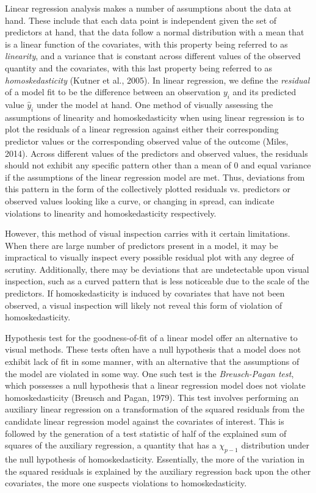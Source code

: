 		Linear regression analysis makes a number of assumptions about the data at hand. These include that each data point is independent given the set of predictors at hand, that the
		data follow a normal distribution with a mean that is a linear function of the covariates, with this property being referred to as \textit{linearity}, and a variance that is constant
		across different values of the observed quantity and the covariates, with this last property being referred to as \textit{homoskedasticity} (Kutner et al., 2005). In linear regression,
		we define the \textit{residual} of a model fit to be the difference between an observation $y_i$ and its predicted value $\hat{y}_i$ under the model at hand. One method of visually
		assessing the assumptions of linearity and homoskedasticity when using linear regression is to plot the residuals of a linear regression against either their corresponding predictor
		values or the corresponding observed value of the outcome (Miles, 2014). Across different values of the predictors and observed values, the residuals should not exhibit any specific pattern
		other than a mean of 0 and equal variance if the assumptions of the linear regression model are met. Thus, deviations from this pattern in the form of the collectively plotted residuals
		vs. predictors or observed values looking like a curve, or changing in spread, can indicate violations to linearity and homoskedasticity respectively.

		However, this method of visual inspection carries with it certain limitations. When there are large number of predictors present in a model, it may be impractical to visually inspect every
		possible residual plot with any degree of scrutiny. Additionally, there may be deviations that are undetectable upon visual inspection, such as a curved pattern that is less noticeable
		due to the scale of the predictors. If homoskedasticity is induced by covariates that have not been observed, a visual inspection will likely not reveal this form of
		violation of homoskedasticity.

		Hypothesis test for the goodness-of-fit of a linear model offer an alternative to visual methods. These tests often have a null hypothesis that a model does not exhibit lack of fit in 
		some manner, with an alternative that the assumptions of the model are violated in some way. One such test is the \textit{Breusch-Pagan test}, which possesses a null hypothesis that a linear
		regression model does not violate homoskedasticity (Breusch and Pagan, 1979). This test involves performing an auxiliary linear regression on a transformation of the squared residuals from
		the candidate linear regression model against the covariates of interest. This is followed by the generation of a test statistic of half of the explained sum of squares of the auxiliary
		regression, a quantity that has a $\chi_{p-1}$ distribution under the null hypothesis of homoskedasticity. Essentially, the more of the variation in the squared residuals is explained by the
		auxiliary regression back upon the other covariates, the more one suspects violations to homoskedasticity.

